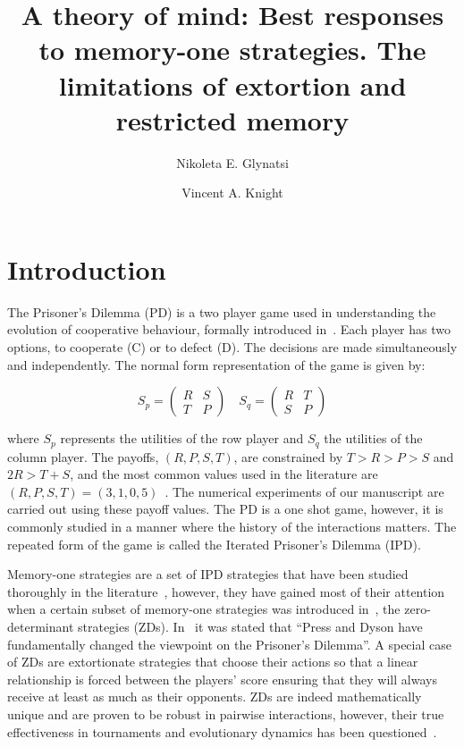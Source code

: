 \documentclass[fleqn,10pt]{wlscirep}
\title{A theory of mind: Best responses to memory-one strategies. The limitations
of extortion and restricted memory}
\author[1,2,*]{Nikoleta E. Glynatsi} %
\author[1]{Vincent A. Knight}
\affil[1]{Cardiff University, School of Mathematics, Cardiff, CF24 4AG, United Kingdom}
\affil[2]{Max Planck Institute for Evolutionary Biology, Pl\"{o}n, 24 306, Germany} %
\affil[*]{glynatsi@evolbio.mpg.de} %
\begin{document}
\flushbottom
\maketitle
%
%
\thispagestyle{empty}

\section*{Introduction}

The Prisoner's Dilemma (PD) is a two player game used in understanding the
evolution of cooperative behaviour, formally introduced in~\cite{Flood1958}.
Each player has two options, to cooperate (C) or to defect (D). The decisions
are made simultaneously and independently. The normal form representation of the
game is given by:

\begin{equation}\label{equ:pd_definition}
    S_p =
    \begin{pmatrix}
        R & S  \\
        T & P
    \end{pmatrix}
    \quad
    S_q =
    \begin{pmatrix}
        R & T  \\
        S & P
    \end{pmatrix}
\end{equation}

where \(S_p\) represents the utilities of the row player and \(S_q\) the
utilities of the column player. The payoffs, \((R, P, S, T)\), are constrained
by \(T > R > P > S\) and \(2R > T + S\), and the most common values used in the
literature are \((R, P, S, T) = (3, 1, 0, 5)\)~\cite{Axelrod1981}.
The numerical experiments of our manuscript are carried out using these
payoff values.
The PD is a one shot game, however, it is commonly studied in a manner where the
history of the interactions matters. The repeated form of the game is called the
Iterated Prisoner's Dilemma (IPD).

Memory-one strategies are a set of IPD strategies that have been
studied thoroughly in the literature~\cite{Nowak1990, Nowak1993}, however, they have gained
most of their attention when a certain subset of memory-one strategies was
introduced in~\cite{Press2012}, the zero-determinant strategies (ZDs). In~\cite{Stewart2012} it
was stated that ``Press and Dyson have fundamentally changed the viewpoint on
the Prisoner's Dilemma''.
A special case of ZDs are extortionate strategies that choose their actions so that a linear relationship is forced
between the players' score ensuring that they will always
receive at least as much as their opponents. ZDs are
indeed mathematically unique and are proven to be robust in pairwise
interactions, however, their true effectiveness in tournaments and
evolutionary dynamics has been questioned~\cite{adami2013, Hilbe2013b,
Hilbe2013, Hilbe2015, Knight2018, Harper2015}.
\end{document}
